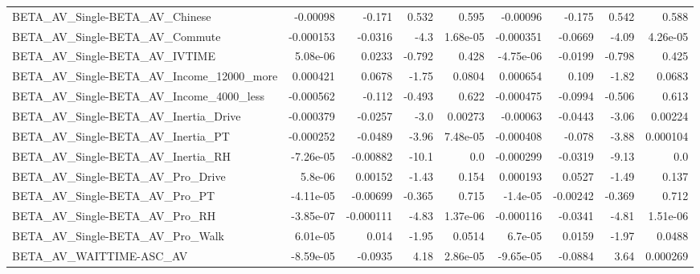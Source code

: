 \begin{tabular}{lrrrrrrrr}
BETA\_AV\_Single-BETA\_AV\_Chinese                     &    -0.00098 &       -0.171 &    0.532 &    0.595 &   -0.00096 &      -0.175 &        0.542 &         0.588 \\
BETA\_AV\_Single-BETA\_AV\_Commute                     &   -0.000153 &      -0.0316 &     -4.3 & 1.68e-05 &  -0.000351 &     -0.0669 &        -4.09 &      4.26e-05 \\
BETA\_AV\_Single-BETA\_AV\_IVTIME                      &    5.08e-06 &       0.0233 &   -0.792 &    0.428 &  -4.75e-06 &     -0.0199 &       -0.798 &         0.425 \\
BETA\_AV\_Single-BETA\_AV\_Income\_12000\_more           &    0.000421 &       0.0678 &    -1.75 &   0.0804 &   0.000654 &       0.109 &        -1.82 &        0.0683 \\
BETA\_AV\_Single-BETA\_AV\_Income\_4000\_less            &   -0.000562 &       -0.112 &   -0.493 &    0.622 &  -0.000475 &     -0.0994 &       -0.506 &         0.613 \\
BETA\_AV\_Single-BETA\_AV\_Inertia\_Drive               &   -0.000379 &      -0.0257 &     -3.0 &  0.00273 &   -0.00063 &     -0.0443 &        -3.06 &       0.00224 \\
BETA\_AV\_Single-BETA\_AV\_Inertia\_PT                  &   -0.000252 &      -0.0489 &    -3.96 & 7.48e-05 &  -0.000408 &      -0.078 &        -3.88 &      0.000104 \\
BETA\_AV\_Single-BETA\_AV\_Inertia\_RH                  &   -7.26e-05 &     -0.00882 &    -10.1 &      0.0 &  -0.000299 &     -0.0319 &        -9.13 &           0.0 \\
BETA\_AV\_Single-BETA\_AV\_Pro\_Drive                   &     5.8e-06 &      0.00152 &    -1.43 &    0.154 &   0.000193 &      0.0527 &        -1.49 &         0.137 \\
BETA\_AV\_Single-BETA\_AV\_Pro\_PT                      &   -4.11e-05 &     -0.00699 &   -0.365 &    0.715 &   -1.4e-05 &    -0.00242 &       -0.369 &         0.712 \\
BETA\_AV\_Single-BETA\_AV\_Pro\_RH                      &   -3.85e-07 &    -0.000111 &    -4.83 & 1.37e-06 &  -0.000116 &     -0.0341 &        -4.81 &      1.51e-06 \\
BETA\_AV\_Single-BETA\_AV\_Pro\_Walk                    &    6.01e-05 &        0.014 &    -1.95 &   0.0514 &    6.7e-05 &      0.0159 &        -1.97 &        0.0488 \\
BETA\_AV\_WAITTIME-ASC\_AV                            &   -8.59e-05 &      -0.0935 &     4.18 & 2.86e-05 &  -9.65e-05 &     -0.0884 &         3.64 &      0.000269 \\

\end{tabular}
